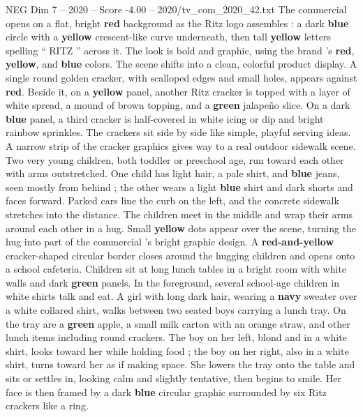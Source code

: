 \begin{textsample}{NEG Dim 7 – 2020 – Score -4.00 – 2020/tv\_com\_2020\_42.txt}  \label{ex:f7_neg_008}
The commercial opens on a flat, bright \textbf{red} background as the Ritz logo assembles : a dark \textbf{blue} circle with a \textbf{yellow} crescent-like curve underneath, then tall \textbf{yellow} letters spelling “ RITZ ” across it.
The look is bold and graphic, using the brand ’s \textbf{red}, \textbf{yellow}, and \textbf{blue} colors.
The scene shifts into a clean, colorful product display.
A single round golden cracker, with scalloped edges and small holes, appears against \textbf{red}.
Beside it, on a \textbf{yellow} panel, another Ritz cracker is topped with a layer of white spread, a mound of brown topping, and a \textbf{green} jalapeño slice.
On a dark \textbf{blue} panel, a third cracker is half-covered in white icing or dip and bright rainbow sprinkles.
The crackers sit side by side like simple, playful serving ideas.
A narrow strip of the cracker graphics gives way to a real outdoor sidewalk scene.
Two very young children, both toddler or preschool age, run toward each other with arms outstretched.
One child has light hair, a pale shirt, and \textbf{blue} jeans, seen mostly from behind ; the other wears a light \textbf{blue} shirt and dark shorts and faces forward.
Parked cars line the curb on the left, and the concrete sidewalk stretches into the distance.
The children meet in the middle and wrap their arms around each other in a hug.
Small \textbf{yellow} dots appear over the scene, turning the hug into part of the commercial ’s bright graphic design.
A \textbf{red-and-yellow} cracker-shaped circular border closes around the hugging children and opens onto a school cafeteria.
Children sit at long lunch tables in a bright room with white walls and dark \textbf{green} panels.
In the foreground, several school-age children in white shirts talk and eat.
A girl with long dark hair, wearing a \textbf{navy} sweater over a white collared shirt, walks between two seated boys carrying a lunch tray.
On the tray are a \textbf{green} apple, a small milk carton with an orange straw, and other lunch items including round crackers.
The boy on her left, blond and in a white shirt, looks toward her while holding food ; the boy on her right, also in a white shirt, turns toward her as if making space.
She lowers the tray onto the table and sits or settles in, looking calm and slightly tentative, then begins to smile.
Her face is then framed by a dark \textbf{blue} circular graphic surrounded by six Ritz crackers like a ring.

\end{textsample}
